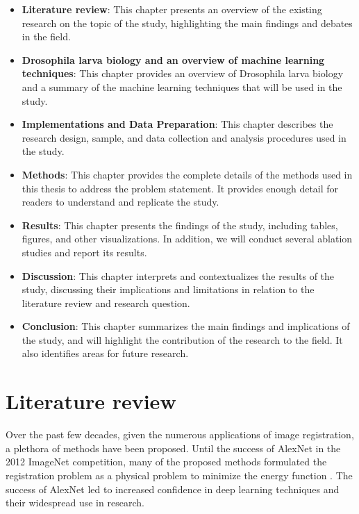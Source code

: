 \documentclass{book}
\begin{document}
	\begin{itemize}
		\item \textbf{Literature review}: This chapter presents an overview of the existing research on the topic of the study, highlighting the main findings and debates in the field.
		\item \textbf{Drosophila larva biology and an overview of machine learning techniques}: This chapter provides an overview of Drosophila larva biology and a summary of the machine learning techniques that will be used in the study.
		\item \textbf{Implementations and Data Preparation}: This chapter describes the research design, sample, and data collection and analysis procedures used in the study. 
		\item \textbf{Methods}: This chapter provides the complete details of the methods used in this thesis to address the problem statement. It provides enough detail for readers to understand and replicate the study.
		\item \textbf{Results}: This chapter presents the findings of the study, including tables, figures, and other visualizations. In addition, we will conduct several ablation studies and report its results.
		\item \textbf{Discussion}: This chapter interprets and contextualizes the results of the study, discussing their implications and limitations in relation to the literature review and research question.
		\item \textbf{Conclusion}: This chapter summarizes the main findings and implications of the study, and will highlight the contribution of the research to the field. It also identifies areas for future research.
	\end{itemize}
	
	\chapter{Literature review}
	\label{chap:litreture}
	Over the past few decades, given the numerous applications of image registration, a plethora of methods have been proposed. Until the success of AlexNet \cite{AlexNet} in the 2012 ImageNet competition, many of the proposed methods formulated the registration problem as a physical problem to minimize the energy function \cite{THIRION1998243} \cite{536892} \cite{5193151} \cite{5338015} \cite{Avants2011ARE} \cite{1009381}. The success of AlexNet led to increased confidence in deep learning techniques and their widespread use in research.
	
\end{document}

